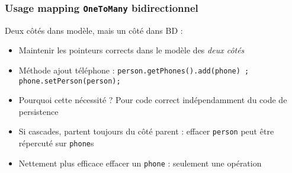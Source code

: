\documentclass[french, english]{beamer}
\begin{document}
\begin{frame}
	\frametitle{Usage mapping \texttt{OneToMany} bidirectionnel}
	Deux côtés dans modèle, mais un côté dans BD :\par
	{\centering
		\par
	}
	
	\begin{itemize}
		\item Maintenir les pointeurs corrects dans le modèle des \emph{deux côtés}
		\item Méthode ajout téléphone : \texttt{person.getPhones().add(phone) ; phone.setPerson(person);}
		\item Pourquoi cette nécessité ? \pause Pour code correct indépendamment du code de persistence \pause
		\item Si cascades, partent toujours du côté parent {\tiny : effacer \texttt{person} peut être répercuté sur \texttt{phone}s}
		\item Nettement plus efficace {\tiny effacer un \texttt{phone} : seulement une opération}%
	\end{itemize}
\end{frame}
\end{document}
